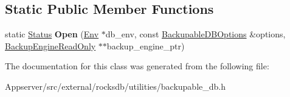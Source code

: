 \subsection*{Static Public Member Functions}
\begin{DoxyCompactItemize}
\item 
static \hyperlink{classrocksdb_1_1Status}{Status} {\bfseries Open} (\hyperlink{classrocksdb_1_1Env}{Env} $\ast$db\+\_\+env, const \hyperlink{structrocksdb_1_1BackupableDBOptions}{Backupable\+D\+B\+Options} \&options, \hyperlink{classrocksdb_1_1BackupEngineReadOnly}{Backup\+Engine\+Read\+Only} $\ast$$\ast$backup\+\_\+engine\+\_\+ptr)\hypertarget{classrocksdb_1_1BackupEngineReadOnly_a22806e0fa2e1def361f722a07f95536a}{}\label{classrocksdb_1_1BackupEngineReadOnly_a22806e0fa2e1def361f722a07f95536a}

\end{DoxyCompactItemize}


The documentation for this class was generated from the following file\+:\begin{DoxyCompactItemize}
\item 
Appserver/src/external/rocksdb/utilities/backupable\+\_\+db.\+h\end{DoxyCompactItemize}
